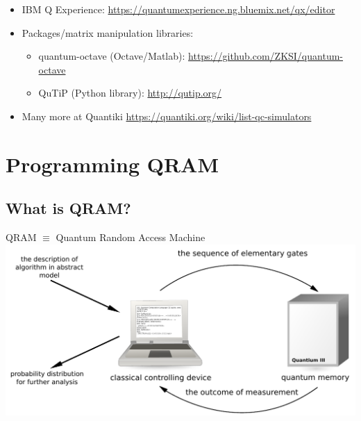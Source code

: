 \documentclass[a4paper,11pt]{article}
\begin{document}
\begin{itemize}
\item IBM Q Experience: 
{\small\url{https://quantumexperience.ng.bluemix.net/qx/editor}}
\item Packages/matrix manipulation libraries:
\begin{itemize}
\item quantum-octave (Octave/Matlab): 
{\small \url{https://github.com/ZKSI/quantum-octave}}
\item QuTiP (Python library): {\small\url{http://qutip.org/}}
\end{itemize}
\item Many more at Quantiki 
\url{https://quantiki.org/wiki/list-qc-simulators}
\end{itemize}



\section{Programming QRAM}





\subsection{What is QRAM?}

\begin{center}
QRAM $\equiv$ Quantum Random Access Machine\\[12pt]
\includegraphics[width=\textwidth]{../slides/pics/qram}
\end{center}
\end{document}
